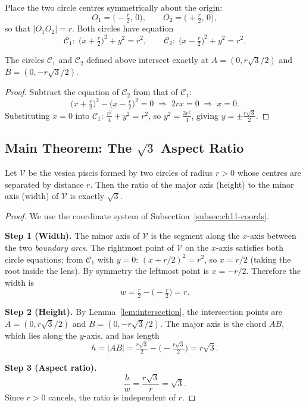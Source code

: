Place the two circle centres symmetrically about the origin:
\[
  O_1 = \bigl(-\tfrac{r}{2},\, 0\bigr), \qquad
  O_2 = \bigl(+\tfrac{r}{2},\, 0\bigr),
\]
so that \(|O_1 O_2| = r\).
Both circles have equation
\[
  \mathcal{C}_1:\; \bigl(x + \tfrac{r}{2}\bigr)^2 + y^2 = r^2, \qquad
  \mathcal{C}_2:\; \bigl(x - \tfrac{r}{2}\bigr)^2 + y^2 = r^2.
\]

\begin{lemma}\label{lem:intersection}
The circles \(\mathcal{C}_1\) and \(\mathcal{C}_2\) defined above intersect
exactly at \(A = (0, r\sqrt{3}/2)\) and \(B = (0, -r\sqrt{3}/2)\).
\end{lemma}

\begin{proof}
Subtract the equation of \(\mathcal{C}_2\) from that of \(\mathcal{C}_1\):
\[
  \bigl(x+\tfrac{r}{2}\bigr)^2 - \bigl(x-\tfrac{r}{2}\bigr)^2 = 0
  \;\Longrightarrow\;
  2rx = 0
  \;\Longrightarrow\;
  x = 0.
\]
Substituting \(x=0\) into \(\mathcal{C}_1\):
\(\tfrac{r^2}{4} + y^2 = r^2\), so \(y^2 = \tfrac{3r^2}{4}\), giving
\(y = \pm \tfrac{r\sqrt{3}}{2}\).
\end{proof}

\subsection{Main Theorem: The \(\sqrt{3}\) Aspect Ratio}
\label{subsec:ch11-main-thm}

\begin{theorem}\label{thm:aspect-ratio}
Let \(\mathcal{V}\) be the vesica piscis formed by two circles of radius
\(r > 0\) whose centres are separated by distance \(r\).
Then the ratio of the major axis (height) to the minor axis (width) of
\(\mathcal{V}\) is exactly \(\sqrt{3}\).
\end{theorem}

\begin{proof}
We use the coordinate system of Subsection~\ref{subsec:ch11-coords}.

\medskip
\noindent\textbf{Step 1 (Width).}
The minor axis of \(\mathcal{V}\) is the segment along the \(x\)-axis
between the two \emph{boundary arcs}.
The rightmost point of \(\mathcal{V}\) on the \(x\)-axis satisfies both
circle equations; from \(\mathcal{C}_1\) with \(y=0\):
\((x + r/2)^2 = r^2\), so \(x = r/2\) (taking the root inside the lens).
By symmetry the leftmost point is \(x = -r/2\).
Therefore the width is
\[
  w = \tfrac{r}{2} - \bigl(-\tfrac{r}{2}\bigr) = r.
\]

\medskip
\noindent\textbf{Step 2 (Height).}
By Lemma~\ref{lem:intersection},
the intersection points are \(A=(0, r\sqrt{3}/2)\) and
\(B=(0,-r\sqrt{3}/2)\).
The major axis is the chord \(AB\), which lies along the \(y\)-axis,
and has length
\[
  h = |AB| = \tfrac{r\sqrt{3}}{2} - \bigl(-\tfrac{r\sqrt{3}}{2}\bigr)
  = r\sqrt{3}.
\]

\medskip
\noindent\textbf{Step 3 (Aspect ratio).}
\[
  \frac{h}{w} = \frac{r\sqrt{3}}{r} = \sqrt{3}.
\]
Since \(r > 0\) cancels, the ratio is independent of \(r\).
\end{proof}


